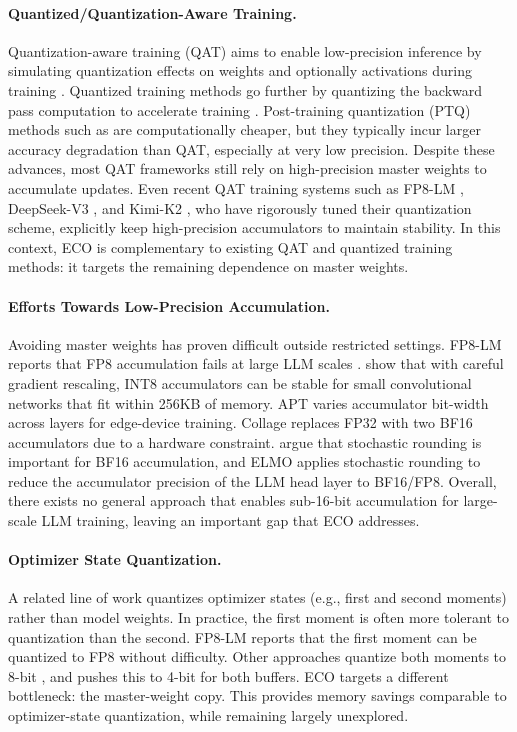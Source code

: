 \documentclass[11pt, a4paper, onecolumn, copyright, goog]{google}
\newcommand{\methodname}{ECO}
\theoremstyle{plain}
\theoremstyle{definition}
\theoremstyle{remark}
\begin{document}
\paragraph{Quantized/Quantization-Aware Training.}
Quantization-aware training (QAT) aims to enable low-precision inference by simulating quantization effects on weights and optionally activations during training \citep{lsq,pact,quest,dorefa,qil,bitnet,effqat,llmqat}. Quantized training methods go further by quantizing the backward pass computation to accelerate training \citep{halo,quartet,alberttseng,fp4alltheway,deepseekv3}. Post-training quantization (PTQ) methods such as \citet{gptq,awq,quarot,spinquant,flatquant} are computationally cheaper, but they typically incur larger accuracy degradation than QAT, especially at very low precision. Despite these advances, most QAT frameworks still rely on high-precision master weights to accumulate updates. Even recent QAT training systems such as FP8-LM \citep{fp8lm}, DeepSeek-V3 \citep{deepseekv3}, and Kimi-K2 \citep{kimik2}, who have rigorously tuned their quantization scheme, explicitly keep high-precision accumulators to maintain stability. In this context, \methodname{} is complementary to existing QAT and quantized training methods: it targets the remaining dependence on master weights.

\paragraph{Efforts Towards Low-Precision Accumulation.}
Avoiding master weights has proven difficult outside restricted settings. FP8-LM reports that FP8 accumulation fails at large LLM scales \citep{fp8lm}. \citet{ondevice} show that with careful gradient rescaling, INT8 accumulators can be stable for small convolutional networks that fit within 256KB of memory. APT \citep{apt} varies accumulator bit-width across layers for edge-device training. Collage \citep{collage} replaces FP32 with two BF16 accumulators due to a hardware constraint. \citet{bf16sr} argue that stochastic rounding is important for BF16 accumulation, and ELMO \citep{elmo} applies stochastic rounding to reduce the accumulator precision of the LLM head layer to BF16/FP8. Overall, there exists no general approach that enables sub-16-bit accumulation for large-scale LLM training, leaving an important gap that \methodname{} addresses.

\paragraph{Optimizer State Quantization.}
A related line of work quantizes optimizer states (e.g., first and second moments) rather than model weights. In practice, the first moment is often more tolerant to quantization than the second. FP8-LM \citep{fp8lm} reports that the first moment can be quantized to FP8 without difficulty. Other approaches quantize both moments to 8-bit \citep{opt8bit,scalingfp8,coat}, and \citet{opt4bit} pushes this to 4-bit for both buffers. \methodname{} targets a different bottleneck: the master-weight copy. This provides memory savings comparable to optimizer-state quantization, while remaining largely unexplored.
\end{document}
